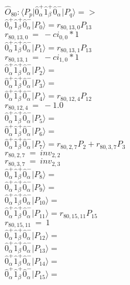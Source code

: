 \documentclass[14pt]{article}
\begin{document}
    $\hat{O}_{80}:  \langle{P_p}\vert \hat{0}_{\alpha}^{+}\hat{1}_{\beta}^{+}\hat{0}_{\alpha}^{-} \vert{P_q}\rangle => $ \\ 
    $ \hat{0}_{\alpha}^{+}\hat{1}_{\beta}^{+}\hat{0}_{\alpha}^{-} \vert{P_{0}}\rangle = {r}_{80,13,0}P_{13} $ \\ 
    ${r}_{80,13,0}\ =\ -{ci}_{0,0}*1 $ \\ 
    $ \hat{0}_{\alpha}^{+}\hat{1}_{\beta}^{+}\hat{0}_{\alpha}^{-} \vert{P_{1}}\rangle = {r}_{80,13,1}P_{13} $ \\ 
    ${r}_{80,13,1}\ =\ -{ci}_{1,0}*1 $ \\ 
    $ \hat{0}_{\alpha}^{+}\hat{1}_{\beta}^{+}\hat{0}_{\alpha}^{-} \vert{P_{2}}\rangle =  $ \\ 
    $ \hat{0}_{\alpha}^{+}\hat{1}_{\beta}^{+}\hat{0}_{\alpha}^{-} \vert{P_{3}}\rangle =  $ \\ 
    $ \hat{0}_{\alpha}^{+}\hat{1}_{\beta}^{+}\hat{0}_{\alpha}^{-} \vert{P_{4}}\rangle = {r}_{80,12,4}P_{12} $ \\ 
    ${r}_{80,12,4}\ =\ -1.0 $ \\ 
    $ \hat{0}_{\alpha}^{+}\hat{1}_{\beta}^{+}\hat{0}_{\alpha}^{-} \vert{P_{5}}\rangle =  $ \\ 
    $ \hat{0}_{\alpha}^{+}\hat{1}_{\beta}^{+}\hat{0}_{\alpha}^{-} \vert{P_{6}}\rangle =  $ \\ 
    $ \hat{0}_{\alpha}^{+}\hat{1}_{\beta}^{+}\hat{0}_{\alpha}^{-} \vert{P_{7}}\rangle = {r}_{80,2,7}P_{2}+{r}_{80,3,7}P_{3} $ \\ 
    ${r}_{80,2,7}\ =\ {inv}_{2,2} $ \\ 
    ${r}_{80,3,7}\ =\ {inv}_{2,3} $ \\ 
    $ \hat{0}_{\alpha}^{+}\hat{1}_{\beta}^{+}\hat{0}_{\alpha}^{-} \vert{P_{8}}\rangle =  $ \\ 
    $ \hat{0}_{\alpha}^{+}\hat{1}_{\beta}^{+}\hat{0}_{\alpha}^{-} \vert{P_{9}}\rangle =  $ \\ 
    $ \hat{0}_{\alpha}^{+}\hat{1}_{\beta}^{+}\hat{0}_{\alpha}^{-} \vert{P_{10}}\rangle =  $ \\ 
    $ \hat{0}_{\alpha}^{+}\hat{1}_{\beta}^{+}\hat{0}_{\alpha}^{-} \vert{P_{11}}\rangle = {r}_{80,15,11}P_{15} $ \\ 
    ${r}_{80,15,11}\ =\ 1 $ \\ 
    $ \hat{0}_{\alpha}^{+}\hat{1}_{\beta}^{+}\hat{0}_{\alpha}^{-} \vert{P_{12}}\rangle =  $ \\ 
    $ \hat{0}_{\alpha}^{+}\hat{1}_{\beta}^{+}\hat{0}_{\alpha}^{-} \vert{P_{13}}\rangle =  $ \\ 
    $ \hat{0}_{\alpha}^{+}\hat{1}_{\beta}^{+}\hat{0}_{\alpha}^{-} \vert{P_{14}}\rangle =  $ \\ 
    $ \hat{0}_{\alpha}^{+}\hat{1}_{\beta}^{+}\hat{0}_{\alpha}^{-} \vert{P_{15}}\rangle =  $ \\ 
    
\end{document}

